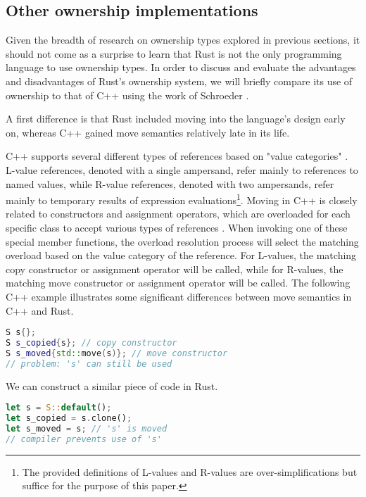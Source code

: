 \documentclass[sigplan,11pt,nonacm]{acmart}
\begin{document}
\subsection{Other ownership implementations}

Given the breadth of research on ownership types explored in previous sections, it should not come as a surprise to learn that Rust is not the only programming language to use ownership types.
In order to discuss and evaluate the advantages and disadvantages of Rust's ownership system, we will briefly compare its use of ownership to that of C++ using the work of Schroeder \cite{cpp-rust-ownership}.

A first difference is that Rust included moving into the language's design early on, whereas C++ gained move semantics relatively late in its life.

C++ supports several different types of references based on "value categories" \cite{cpp-value-categories}.
L-value references, denoted with a single ampersand, refer mainly to references to named values, while R-value references, denoted with two ampersands, refer mainly to temporary results of expression evaluations\footnote{The provided definitions of L-values and R-values are over-simplifications but suffice for the purpose of this paper.}.
Moving in C++ is closely related to constructors and assignment operators, which are overloaded for each specific class to accept various types of references \cite{cpp-rust-ownership}.
When invoking one of these special member functions, the overload resolution process will select the matching overload based on the value category of the reference.
For L-values, the matching copy constructor or assignment operator will be called, while for R-values, the matching move constructor or assignment operator will be called.
The following C++ example illustrates some significant differences between move semantics in C++ and Rust.

\begin{lstlisting}[language=C++]
S s{};
S s_copied{s}; // copy constructor
S s_moved{std::move(s)}; // move constructor
// problem: 's' can still be used
\end{lstlisting}

We can construct a similar piece of code in Rust.

\begin{lstlisting}[language=Rust]
let s = S::default();
let s_copied = s.clone();
let s_moved = s; // 's' is moved
// compiler prevents use of 's'
\end{lstlisting}
\end{document}
